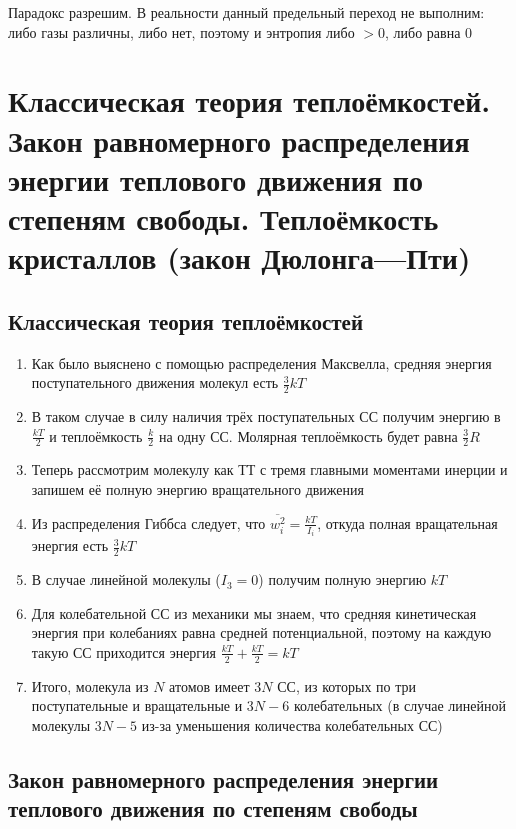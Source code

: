 \documentclass[a4paper, 14pt]{article}
\begin{document}
    Парадокс разрешим.
    В реальности данный предельный переход не выполним: либо газы различны, либо нет, поэтому и энтропия либо $>0$,
    либо равна $0$
    
    \section{Классическая теория теплоёмкостей.
    Закон равномерного распределения энергии теплового движения по степеням свободы.
    Теплоёмкость кристаллов (закон Дюлонга—Пти)}
    
    \subsection{Классическая теория теплоёмкостей}
    
    \begin{enumerate}
        \item Как было выяснено с помощью распределения Максвелла, средняя энергия поступательного движения молекул
        есть $\frac{3}{2} kT$
        \item В таком случае в силу наличия трёх поступательных СС получим энергию в $\frac{kT}{2}$ и теплоёмкость
        $\frac{k}{2}$ на одну СС.
        Молярная теплоёмкость будет равна $\frac{3}{2}R$
        \item Теперь рассмотрим молекулу как ТТ с тремя главными моментами инерции и запишем её полную энергию
        вращательного движения
        \item Из распределения Гиббса следует, что $\overline{w^2_i} = \frac{kT}{I_i}$, откуда полная вращательная
        энергия есть $\frac{3}{2} kT$
        \item В случае линейной молекулы ($I_3 = 0$) получим полную энергию $kT$
        \item Для колебательной СС из механики мы знаем, что средняя кинетическая энергия при колебаниях равна
        средней потенциальной, поэтому на каждую такую СС приходится энергия $\frac{kT}{2} + \frac{kT}{2} = kT$
        \item Итого, молекула из $N$ атомов имеет $3N$ СС, из которых по три поступательные и вращательные и $3N - 6$
        колебательных (в случае линейной молекулы $3N - 5$ из-за уменьшения количества колебательных СС)
    \end{enumerate}
    
    \subsection{Закон равномерного распределения энергии теплового движения по степеням свободы}
    
\end{document}
